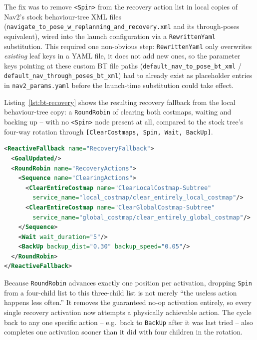 The fix was to remove \texttt{<Spin>} from the recovery action list
in local copies of Nav2's stock behaviour-tree XML files
(\texttt{navigate\_to\_pose\_w\_replanning\_and\_recovery.xml} and
its through-poses equivalent), wired into the launch configuration
via a \texttt{RewrittenYaml} substitution. This required one
non-obvious step: \texttt{RewrittenYaml} only overwrites
\emph{existing} leaf keys in a YAML file, it does not add new ones,
so the parameter keys pointing at these custom BT file paths
(\texttt{default\_nav\_to\_pose\_bt\_xml} /
\texttt{default\_nav\_through\_poses\_bt\_xml}) had to already exist
as placeholder entries in \texttt{nav2\_params.yaml} before the
launch-time substitution could take effect.

Listing~\ref{lst:bt-recovery} shows the resulting recovery fallback
from the local behaviour-tree copy: a \texttt{RoundRobin} of clearing
both costmaps, waiting and backing up -- with no \texttt{<Spin>}
node present at all, compared to the stock tree's four-way rotation
through \texttt{[ClearCostmaps, Spin, Wait, BackUp]}.

\begin{lstlisting}[language=XML,caption={Recovery actions in the local behaviour-tree copy (\texttt{config/nav2/behavior\_trees/navigate\_to\_pose\_w\_replanning\_and\_recovery.xml}) -- no \texttt{<Spin>} node, unlike the Nav2 stock tree.},label={lst:bt-recovery}]
<ReactiveFallback name="RecoveryFallback">
  <GoalUpdated/>
  <RoundRobin name="RecoveryActions">
    <Sequence name="ClearingActions">
      <ClearEntireCostmap name="ClearLocalCostmap-Subtree"
        service_name="local_costmap/clear_entirely_local_costmap"/>
      <ClearEntireCostmap name="ClearGlobalCostmap-Subtree"
        service_name="global_costmap/clear_entirely_global_costmap"/>
    </Sequence>
    <Wait wait_duration="5"/>
    <BackUp backup_dist="0.30" backup_speed="0.05"/>
  </RoundRobin>
</ReactiveFallback>
\end{lstlisting}

Because \texttt{RoundRobin} advances exactly one position per
activation, dropping \texttt{Spin} from a four-child list to this
three-child list is not merely ``the useless action happens less
often.'' It removes the guaranteed no-op activation entirely, so
every single recovery activation now attempts a physically
achievable action. The cycle back to any one specific action --
e.g.\ back to \texttt{BackUp} after it was last tried -- also
completes one activation sooner than it did with four children in
the rotation.

